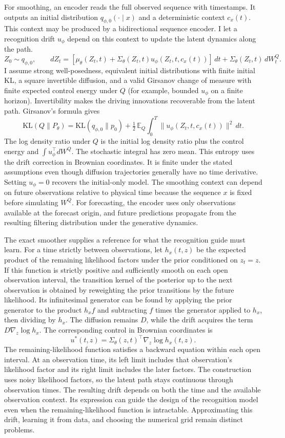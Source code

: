 \documentclass[12pt]{article}
\newcommand{\E}{\mathbb{E}}
\newcommand{\KL}{\mathrm{KL}}
\newcommand{\half}{\tfrac12}
\begin{document}
For smoothing, an encoder reads the full observed sequence with timestamps. It outputs an initial distribution \(q_{\phi,0}(\cdot\mid x)\) and a deterministic context \(c_x(t)\). This context may be produced by a bidirectional sequence encoder. I let a recognition drift \(u_\phi\) depend on this context to update the latent dynamics along the path.
\[
 Z_0\sim q_{\phi,0},\qquad
 dZ_t=[\mu_\theta(Z_t,t)+\Sigma_\theta(Z_t,t)u_\phi(Z_t,t,c_x(t))]\,dt
       +\Sigma_\theta(Z_t,t)\,dW_t^Q.
\]
I assume strong well-posedness, equivalent initial distributions with finite initial KL, a square invertible diffusion, and a valid Girsanov change of measure with finite expected control energy under \(Q\) (for example, bounded \(u_\phi\) on a finite horizon). Invertibility makes the driving innovations recoverable from the latent path. Girsanov's formula \citep{girsanov1960transforming} gives
\[
 \KL(Q\|P_\theta)=\KL(q_{\phi,0}\|p_0)+
   \half\,\E_Q\int_0^T \|u_\phi(Z_t,t,c_x(t))\|^2\,dt .
\]
The log density ratio under \(Q\) is the initial log density ratio plus the control energy and \(\int u_\phi^\top dW^Q\). The stochastic integral has zero mean. This entropy uses the drift correction in Brownian coordinates. It is finite under the stated assumptions even though diffusion trajectories generally have no time derivative. Setting \(u_\phi=0\) recovers the initial-only model. The smoothing context can depend on future observations relative to physical time because the sequence \(x\) is fixed before simulating \(W^Q\). For forecasting, the encoder uses only observations available at the forecast origin, and future predictions propagate from the resulting filtering distribution under the generative dynamics.

The exact smoother supplies a reference for what the recognition guide must learn. For a time strictly between observations, let \(h_x(t,z)\) be the expected product of the remaining likelihood factors under the prior conditioned on \(z_t=z\). If this function is strictly positive and sufficiently smooth on each open observation interval, the transition kernel of the posterior up to the next observation is obtained by reweighting the prior transitions by the future likelihood. Its infinitesimal generator can be found by applying the prior generator to the product \(h_x f\) and subtracting \(f\) times the generator applied to \(h_x\), then dividing by \(h_x\). The diffusion remains \(D\), while the drift acquires the term \(D\nabla_z\log h_x\). The corresponding control in Brownian coordinates is
\[
 u^*(t,z)=\Sigma_\theta(z,t)^\top\nabla_z\log h_x(t,z).
\]
The remaining-likelihood function satisfies a backward equation within each open interval. At an observation time, its left limit includes that observation's likelihood factor and its right limit includes the later factors. The construction uses noisy likelihood factors, so the latent path stays continuous through observation times. The resulting drift depends on both the time and the available observation context. Its expression can guide the design of the recognition model even when the remaining-likelihood function is intractable. Approximating this drift, learning it from data, and choosing the numerical grid remain distinct problems.
\end{document}
